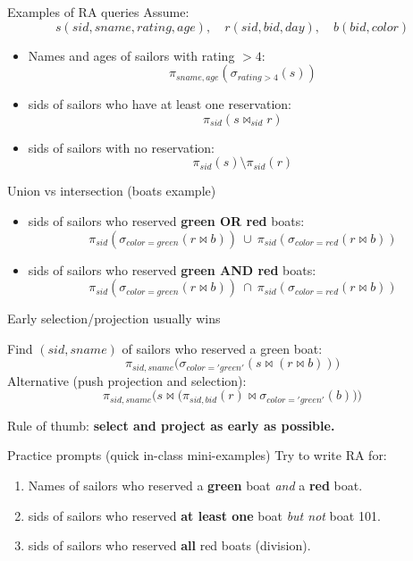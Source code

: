\documentclass[10pt,aspectratio=169]{beamer}
\newcommand{\select}{\sigma}
\newcommand{\proj}{\pi}
\begin{document}
\begin{frame}{Examples of RA queries}
Assume:
\[
s(sid,sname,rating,age),\quad r(sid,bid,day),\quad b(bid,color)
\]
\begin{itemize}
  \item Names and ages of sailors with rating \(>4\):
  \[
  \proj_{sname,age}(\select_{rating>4}(s))
  \]
  \item sids of sailors who have at least one reservation:
  \[
  \proj_{sid}(s \Join_{sid} r)
  \]
  \item sids of sailors with no reservation:
  \[
  \proj_{sid}(s)\setminus \proj_{sid}(r)
  \]
\end{itemize}
\end{frame}

\begin{frame}{Union vs intersection (boats example)}
\small
\begin{itemize}
  \item sids of sailors who reserved \textbf{green OR red} boats:
  \[
  \proj_{sid}(\select_{color=green}(r\Join b))\ \cup\ \proj_{sid}(\select_{color=red}(r\Join b))
  \]
  \item sids of sailors who reserved \textbf{green AND red} boats:
  \[
  \proj_{sid}(\select_{color=green}(r\Join b))\ \cap\ \proj_{sid}(\select_{color=red}(r\Join b))
  \]
\end{itemize}
\end{frame}

\begin{frame}{Early selection/projection usually wins}
\small
\begin{example}
Find \((sid,sname)\) of sailors who reserved a green boat:
\[
\proj_{sid,sname}\big(\select_{color='green'}(s \Join (r \Join b))\big)
\]
Alternative (push projection and selection):
\[
\proj_{sid,sname}\Big(s \Join \big(\proj_{sid,bid}(r)\Join \select_{color='green'}(b)\big)\Big)
\]
\end{example}
Rule of thumb: \textbf{select and project as early as possible.}
\end{frame}

\begin{frame}{Practice prompts (quick in-class mini-examples)}
Try to write RA for:
\begin{enumerate}
  \item Names of sailors who reserved a \textbf{green} boat \emph{and} a \textbf{red} boat.
  \item sids of sailors who reserved \textbf{at least one} boat \emph{but not} boat 101.
  \item sids of sailors who reserved \textbf{all} red boats (division).
\end{enumerate}
\end{frame}
\end{document}

